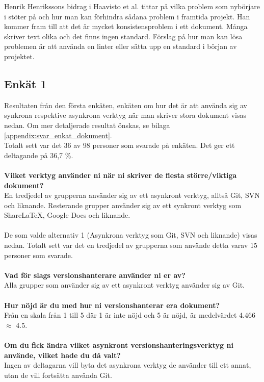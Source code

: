 Henrik Henrikssons bidrag i Haavisto et al. \cite{Haavisto954095} tittar på vilka problem som nybörjare i \latex stöter på och hur man kan förhindra sådana problem i framtida projekt. Han kommer fram till att det är mycket konsistensproblem i ett \latex dokument. Många skriver text olika och det finns ingen standard. Förslag på hur man kan lösa problemen är att använda en linter eller sätta upp en standard i början av projektet.

\subsection{Enkät 1}
Resultaten från den första enkäten, enkäten om hur det är att använda sig av synkrona respektive asynkrona verktyg när man skriver stora dokument visas nedan. Om mer detaljerade resultat önskas, se bilaga \ref{appendix:svar_enkat_dokument}.\\
Totalt sett var det 36 av 98 personer som svarade på enkäten. Det ger ett deltagande på 36,7 \%.\\
\\\textbf{Vilket verktyg använder ni när ni skriver de flesta större/viktiga dokument?}\\
En tredjedel av grupperna använder sig av ett asynkront verktyg, alltså Git, SVN och liknande. Resterande grupper använder sig av ett synkront verktyg som ShareLaTeX, Google Docs och liknande.\\\\
De som valde alternativ 1 (Asynkrona verktyg som Git, SVN och liknande) visas nedan. Totalt sett var det en tredjedel av grupperna som använde detta varav 15 personer som svarade.\\\\
\textbf{Vad för slags versionshanterare använder ni er av?}\\
Alla grupper som använder sig av ett asynkront verktyg använder sig av Git.\\\\
\textbf{Hur nöjd är du med hur ni versionshanterar era dokument?}\\
Från en skala från 1 till 5 där 1 är inte nöjd och 5 är nöjd, är medelvärdet 4.466 $\approx$ 4.5.\\\\
\textbf{Om du fick ändra vilket asynkront versionshanteringsverktyg ni använde, vilket hade du då valt?}\\
Ingen av deltagarna vill byta det asynkrona verktyg de använder till ett annat, utan de vill fortsätta använda Git.\\\\
